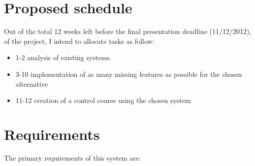 \documentclass[12pt]{article}
\begin{document}
\section{Proposed schedule}

Out of the total 12 weeks left before the final presentation deadline (11/12/2012), of the project, I intend to allocate tasks as follow:

\begin{itemize}
  \item 1-2 analysis of existing systems.
  \item 3-10 implementation of as many missing features as possible for the chosen alternative
  \item 11-12 creation of a control course using the chosen system
\end{itemize}

\section{Requirements}

The primary requirements of this system are:
\end{document}
